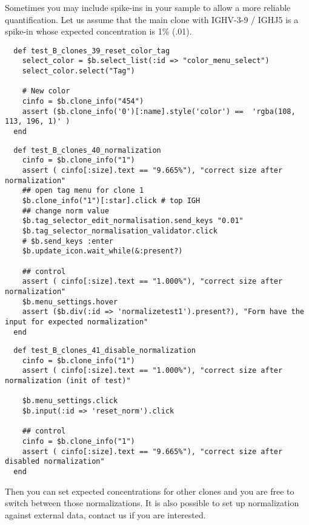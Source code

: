 Sometimes you may include spike-ins in your sample to allow a more reliable
quantification.
Let us assume that the main clone with IGHV-3-9 / IGHJ5 is a spike-in whose
expected concentration is 1\% (.01).

\begin{verbatim}
  def test_B_clones_39_reset_color_tag
    select_color = $b.select_list(:id => "color_menu_select")
    select_color.select("Tag")

    # New color
    cinfo = $b.clone_info("454")
    assert ($b.clone_info('0')[:name].style('color') ==  'rgba(108, 113, 196, 1)' )
  end
\end{verbatim}

\begin{verbatim}
  def test_B_clones_40_normalization
    cinfo = $b.clone_info("1")
    assert ( cinfo[:size].text == "9.665%"), "correct size after normalization"
    ## open tag menu for clone 1
    $b.clone_info("1")[:star].click # top IGH
    ## change norm value
    $b.tag_selector_edit_normalisation.send_keys "0.01"
    $b.tag_selector_normalisation_validator.click
    # $b.send_keys :enter
    $b.update_icon.wait_while(&:present?)

    ## control
    assert ( cinfo[:size].text == "1.000%"), "correct size after normalization"
    $b.menu_settings.hover
    assert ($b.div(:id => 'normalizetest1').present?), "Form have the input for expected normalization"
  end
\end{verbatim}

\begin{verbatim}
  def test_B_clones_41_disable_normalization
    cinfo = $b.clone_info("1")
    assert ( cinfo[:size].text == "1.000%"), "correct size after normalization (init of test)"
    
    $b.menu_settings.click
    $b.input(:id => 'reset_norm').click

    ## control
    cinfo = $b.clone_info("1")
    assert ( cinfo[:size].text == "9.665%"), "correct size after disabled normalization"
  end
\end{verbatim}

Then you can set expected concentrations for other clones and you are free to
switch between those normalizations.
It is also possible to set up normalization against external data,
contact us if you are interested.

